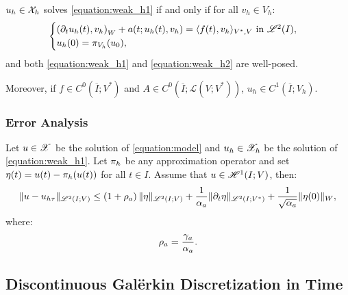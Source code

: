 \begin{proposition}[Equivalence]
    $u_h \in \mathcal{X}_h$ solves \cref{equation:weak_h1} if and only if for all $v_h \in V_h$:
    \begin{gather}
        \begin{cases} \label{equation:weak_h2}
            \left( \partial_t u_h(t), v_h \right)_W + a(t; u_h(t), v_h) = \langle f(t), v_h \rangle_{V^*, V} \text{ in } \mathscr{L}^{2}(I), \\
            u_h(0) = \pi_{V_h}(u_0),
        \end{cases}
    \end{gather}
    and both \cref{equation:weak_h1} and \cref{equation:weak_h2} are well-posed.

    Moreover, if $f \in C^0(\overline{I}; V^*)$ and $A \in C^0(\overline{I}; \mathcal{L}(V; V^*))$, $u_h \in C^1(\overline{I}; V_h)$.
\end{proposition}

\subsubsection{Error Analysis}




\begin{theorem} \label{theorem:estimate_h}
    Let $u \in \mathscr{X}$ be the solution of \cref{equation:model} and $u_h \in \mathscr{X}_h$ be the solution of \cref{equation:weak_h1}. Let $\pi_h$ be any approximation operator and set $\eta(t) = u(t) - \pi_h(u(t))$ for all $t \in I$. Assume that $u \in \mathscr{H}^{1}(I; V)$, then:
    \begin{gather}
        \lVert u - u_{h \tau} \rVert_{\mathscr{L}^{2}(I; V)} \leq \left( 1 + \rho_{a} \right) \lVert \eta \rVert_{\mathscr{L}^{2}(I; V)} + \frac{1}{\alpha_{a}} \lVert \partial_t \eta \rVert_{\mathscr{L}^{2}(I; V^*)} + \frac{1}{\sqrt{\alpha_{a}}} \lVert \eta(0) \rVert_W,
    \end{gather}
    where:
    \begin{gather}
        \rho_{a} = \frac{\gamma_{a}}{\alpha_{a}}.
    \end{gather}
\end{theorem}

\newpage
\subsection{Discontinuous Galërkin Discretization in Time} \label{subsection:time_dg}

